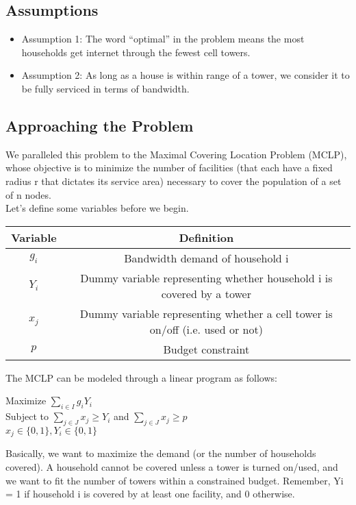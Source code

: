 	\subsection*{Assumptions}
	\begin{itemize}
	\item Assumption 1: The word “optimal” in the problem means the most households get internet through the fewest cell towers.
	\item Assumption 2: As long as a house is within range of a tower, we consider it to be fully serviced in terms of bandwidth.
	\end{itemize}

	\subsection*{Approaching the Problem}
	We paralleled this problem to the Maximal Covering Location Problem (MCLP), whose objective is to minimize the number of facilities (that each have a fixed radius r that dictates its service area) necessary to cover the population of a set of n nodes.\\
	\indent Let’s define some variables before we begin.
	\begin{center} \begin{tabular} {|c|c|}
		\hline
		Variable & Definition \\
		\hline
		$g_i$ & Bandwidth demand of household i\\
		\hline
		$Y_i$ & Dummy variable representing whether household i is covered by a tower \\
		\hline
		$x_j$ & Dummy variable representing whether a cell tower is on/off (i.e. used or not) \\
		\hline
		$p$ & Budget constraint \\
		\hline
	\end{tabular} \end{center}
	\indent The MCLP can be modeled through a linear program as follows:
	\begin{center}
		Maximize $\sum_{i\in I} g_iY_i$ \\
		Subject to $\sum_{j\in J}x_j \geq Y_i$ and $\sum_{j\in J}x_j \geq p$ \\
		$x_j \in \{0,1\}, Y_i \in \{0,1\}$
	\end{center}
	Basically, we want to maximize the demand (or the number of households covered). A household cannot be covered unless a tower is turned on/used, and we want to fit the number of towers within a constrained budget. Remember, Yi = 1 if household i is covered by at least one facility, and 0 otherwise.

